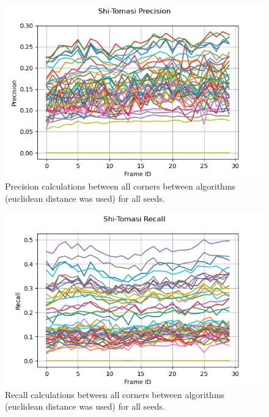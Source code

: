 \documentclass[11pt, conference, letterpaper]{IEEEtran}
\begin{document}
\begin{figure}[h]
    \centering
    \includegraphics[width=\linewidth]{mc_images/mc_stc_precision.png}
    \caption{Precision calculations between all corners between algorithms (euclidean distance was used) for all seeds.}
    \label{fig:mc_stc_prec}
\end{figure}

\begin{figure}[h]
    \centering
    \includegraphics[width=\linewidth]{mc_images/mc_stc_recall.png}
    \caption{Recall calculations between all corners between algorithms (euclidean distance was used) for all seeds.}
    \label{fig:mc_stc_rec}
\end{figure}
\end{document}
